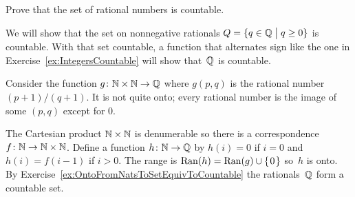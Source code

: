 \begin{problem} 
  Prove that the set of rational numbers is countable.
\begin{answer}
  We will show that the set on nonnegative rationals
  $Q=\{q\in\mathbb{Q} \bigm| q\geq 0\}$ is countable.
  With that set countable, a function that alternates sign like the one in 
  Exercise~\ref{ex:IntegersCountable} will show that~$\mathbb{Q}$ is countable.

  Consider the function $\mbox{$g\colon \mathbb{N}\times\mathbb{N}\to \mathbb{Q}$}$ where $g(p,q)$
  is the rational number $(p+1)/(q+1)$.
  It is not quite onto; every rational number is the image of some
  $(p,q)$ except for $0$.

  The Cartesian product $\mathbb{N}\times\mathbb{N}$ is denumerable so there is a 
  correspondence $\mbox{$f\colon \mathbb{N}\to \mathbb{N}\times\mathbb{N}$}$.
  Define a function $\mbox{$h\colon \mathbb{N}\to \mathbb{Q}$}$ by $h(i)=0$ if $i=0$ and $h(i)=f(i-1)$
  if $i>0$.
  The range is $\operatorname{Ran}(h)=\operatorname{Ran}(g)\cup\mbox{$\{\hspace{0.1em}0\hspace{0.1em}\}$}$ so~$h$ is onto.
  By Exercise~\ref{ex:OntoFromNatsToSetEquivToCountable} the 
  rationals~$\mathbb{Q}$ form a countable set.
\end{answer}
\end{problem}

